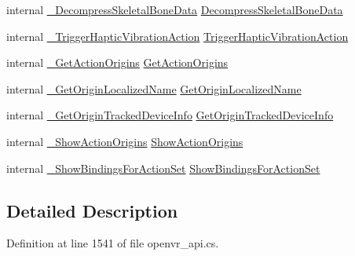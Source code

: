 \begin{DoxyCompactItemize}
\item 
internal \mbox{\hyperlink{struct_valve_1_1_v_r_1_1_i_v_r_input_ae399aa93e9fa3f84762ce5e124b7c6fb}{\+\_\+\+Decompress\+Skeletal\+Bone\+Data}} \mbox{\hyperlink{struct_valve_1_1_v_r_1_1_i_v_r_input_a878e073b942db8102323fc37e8e2174c}{Decompress\+Skeletal\+Bone\+Data}}
\item 
internal \mbox{\hyperlink{struct_valve_1_1_v_r_1_1_i_v_r_input_acccca4f15062478fdac76cc1e1a95ec5}{\+\_\+\+Trigger\+Haptic\+Vibration\+Action}} \mbox{\hyperlink{struct_valve_1_1_v_r_1_1_i_v_r_input_ab55041f8c5935e98c8843bc6069c170a}{Trigger\+Haptic\+Vibration\+Action}}
\item 
internal \mbox{\hyperlink{struct_valve_1_1_v_r_1_1_i_v_r_input_a07748e313f1d66ea8b3455c15b5a35fe}{\+\_\+\+Get\+Action\+Origins}} \mbox{\hyperlink{struct_valve_1_1_v_r_1_1_i_v_r_input_ad2713fbf01ae6a94d48816f5b07e6a4b}{Get\+Action\+Origins}}
\item 
internal \mbox{\hyperlink{struct_valve_1_1_v_r_1_1_i_v_r_input_a17e8c670555ed63bd87786abfe4f7b1c}{\+\_\+\+Get\+Origin\+Localized\+Name}} \mbox{\hyperlink{struct_valve_1_1_v_r_1_1_i_v_r_input_a3a2f4277159d146a50e7054c0426e72f}{Get\+Origin\+Localized\+Name}}
\item 
internal \mbox{\hyperlink{struct_valve_1_1_v_r_1_1_i_v_r_input_add5ead75e93d50c200dd32cfd51abb31}{\+\_\+\+Get\+Origin\+Tracked\+Device\+Info}} \mbox{\hyperlink{struct_valve_1_1_v_r_1_1_i_v_r_input_a6d0207256fdbd33a0ed3db1913ccbb6c}{Get\+Origin\+Tracked\+Device\+Info}}
\item 
internal \mbox{\hyperlink{struct_valve_1_1_v_r_1_1_i_v_r_input_a09f1677e540d63032f2fd346bcde9ff7}{\+\_\+\+Show\+Action\+Origins}} \mbox{\hyperlink{struct_valve_1_1_v_r_1_1_i_v_r_input_a0142f929ca5159989ec8922d4fbf2bff}{Show\+Action\+Origins}}
\item 
internal \mbox{\hyperlink{struct_valve_1_1_v_r_1_1_i_v_r_input_a88a0bc2f348e8f0bf77bf25907434041}{\+\_\+\+Show\+Bindings\+For\+Action\+Set}} \mbox{\hyperlink{struct_valve_1_1_v_r_1_1_i_v_r_input_a4d11605a94148b00490d688861421bed}{Show\+Bindings\+For\+Action\+Set}}
\end{DoxyCompactItemize}


\subsection{Detailed Description}


Definition at line 1541 of file openvr\+\_\+api.\+cs.



